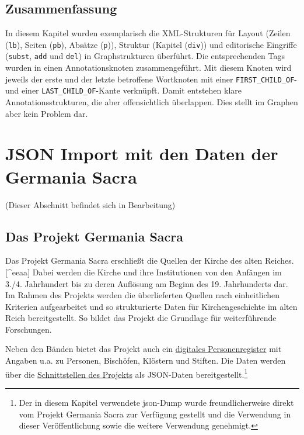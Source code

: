 \documentclass[ngerman,]{scrreprt}
\begin{document}
\section{Zusammenfassung}\label{zusammenfassung-5}

In diesem Kapitel wurden exemplarisch die XML-Strukturen für Layout (Zeilen (\texttt{lb}), Seiten (\texttt{pb}), Absätze (\texttt{p})), Struktur (Kapitel (\texttt{div})) und editorische Eingriffe (\texttt{subst}, \texttt{add} und \texttt{del}) in Graphstrukturen überführt. Die entsprechenden Tags wurden in einen Annotationsknoten zusammengeführt. Mit diesem Knoten wird jeweils der erste und der letzte betroffene Wortknoten mit einer \texttt{FIRST\_CHILD\_OF}- und einer \texttt{LAST\_CHILD\_OF}-Kante verknüpft. Damit entstehen klare Annotationsstrukturen, die aber offensichtlich überlappen. Dies stellt im Graphen aber kein Problem dar.

\chapter{JSON Import mit den Daten der Germania Sacra}\label{json-import-mit-den-daten-der-germania-sacra}

(Dieser Abschnitt befindet sich in Bearbeitung)

\section{Das Projekt Germania Sacra}\label{das-projekt-germania-sacra}

Das Projekt Germania Sacra erschließt die Quellen der Kirche des alten Reiches.{[}\^{}eeaa{]} Dabei werden die Kirche und ihre Institutionen von den Anfängen im 3./4. Jahrhundert bis zu deren Auflösung am Beginn des 19. Jahrhunderts dar. Im Rahmen des Projekts werden die überlieferten Quellen nach einheitlichen Kriterien aufgearbeitet und so strukturierte Daten für Kirchengeschichte im alten Reich bereitgestellt. So bildet das Projekt die Grundlage für weiterführende Forschungen.

Neben den Bänden bietet das Projekt auch ein \href{https://adw-goe.de/forschung/forschungsprojekte-akademienprogramm/germania-sacra/digitales-personenregister/}{digitales Personenregister} mit Angaben u.a. zu Personen, Bischöfen, Klöstern und Stiften. Die Daten werden über die \href{https://adw-goe.de/forschung/forschungsprojekte-akademienprogramm/germania-sacra/schnittstellen-und-linked-data/}{Schnittstellen des Projekts} als JSON-Daten bereitgestellt.\footnote{Der in diesem Kapitel verwendete json-Dump wurde freundlicherweise direkt vom Projekt Germania Sacra zur Verfügung gestellt und die Verwendung in dieser Veröffentlichung sowie die weitere Verwendung genehmigt.}
\end{document}

